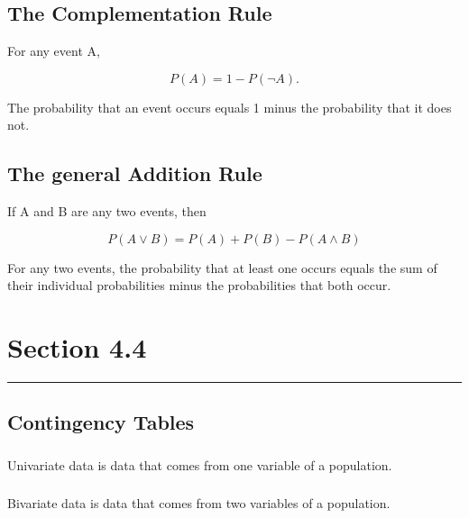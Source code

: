 \documentclass[12pt]{article}
\begin{document}
        \subsection*{The Complementation Rule}
            For any event A,
            \begin{center}
                \[
                    P(A) = 1 - P(\neg A).                
                \]
            \end{center}
            The probability that an event occurs equals 1 minus the probability that it does not.
        \subsection*{The general Addition Rule}
            If A and B are any two events, then
            \begin{center}
                \[
                    P(A \vee B) = P(A) + P(B) - P(A \wedge B) 
                \]
            \end{center}
            For any two events, the probability that at least one occurs equals the sum of their
            individual probabilities minus the probabilities that both occur.
    \section*{Section 4.4}
    \noindent\rule{\textwidth}{0.4pt}
        \subsection*{Contingency Tables}
            \subsubsection*{}
                Univariate data is data that comes from one variable of a population.
            \subsubsection*{}
                Bivariate data is data that comes from two variables of a population.
\end{document}

